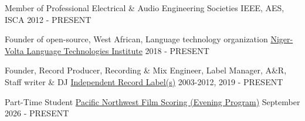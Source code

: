 

\begin{cventries}
	
  \cventry
    {Member of Professional Electrical \& Audio Engineering Societies} %
    {IEEE, AES, ISCA} %
    {} %
    {2012 - PRESENT} %
    {}

  \cventry
    {Founder of open-source, West African, Language technology organization} %
    {\href{https://github.com/Niger-Volta-LTI}{Niger-Volta Language Technologies Institute}} %
    {} %
    {2018 - PRESENT} %
    {}


%    
  \cventry
    {Founder, Record Producer, Recording \& Mix Engineer, Label Manager, A\&R, Staff writer \& DJ} %
    {\href{http://www.discogs.com/label/43535-Defchild-Productions}{Independent Record Label(s)}} %
    {} %
    {2003-2012, 2019 - PRESENT} %
    {}
		
  \cventry
    {Part-Time Student} %
    {\href{https://www.pnwfilmmusic.com}{Pacific Northwest Film Scoring (Evening Program)}} %
    {} %
    {September 2026 - PRESENT} %
    {}
    
\end{cventries}
